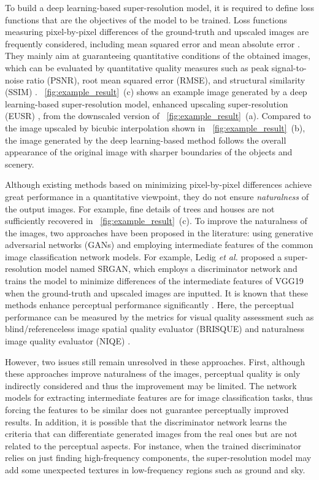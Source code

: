\documentclass[runningheads]{llncs}
\begin{document}
To build a deep learning-based super-resolution model, it is required to define loss functions that are the objectives of the model to be trained.
Loss functions measuring pixel-by-pixel differences of the ground-truth and upscaled images are frequently considered, including mean squared error and mean absolute error \cite{yang2018deep}.
They mainly aim at guaranteeing quantitative conditions of the obtained images, which can be evaluated by quantitative quality measures such as peak signal-to-noise ratio (PSNR), root mean squared error (RMSE), and structural similarity (SSIM) \cite{wang2004image}.
\figurename~\ref{fig:example_result}~(c) shows an example image generated by a deep learning-based super-resolution model, enhanced upscaling super-resolution (EUSR) \cite{kim2018deep}, from the downscaled version of \figurename~\ref{fig:example_result}~(a).
Compared to the image upscaled by bicubic interpolation shown in \figurename~\ref{fig:example_result}~(b), the image generated by the deep learning-based method follows the overall appearance of the original image with sharper boundaries of the objects and scenery.

Although existing methods based on minimizing pixel-by-pixel differences achieve great performance in a quantitative viewpoint, they do not ensure \textit{naturalness} of the output images.
For example, fine details of trees and houses are not sufficiently recovered in \figurename~\ref{fig:example_result}~(c).
To improve the naturalness of the images, two approaches have been proposed in the literature: using generative adversarial networks (GANs) \cite{goodfellow2014generative} and employing intermediate features of the common image classification network models.
For example, Ledig \textit{et al.} \cite{ledig2017photo} proposed a super-resolution model named SRGAN, which employs a discriminator network and trains the model to minimize differences of the intermediate features of VGG19 \cite{simonyan2014very} when the ground-truth and upscaled images are inputted.
It is known that these methods enhance perceptual performance significantly \cite{blau2017perception}.
Here, the perceptual performance can be measured by the metrics for visual quality assessment such as blind/referenceless image spatial quality evaluator (BRISQUE) \cite{mittal2012no} and naturalness image quality evaluator (NIQE) \cite{mittal2013making}.

However, two issues still remain unresolved in these approaches.
First, although these approaches improve naturalness of the images, perceptual quality is only indirectly considered and thus the improvement may be limited.
The network models for extracting intermediate features are for image classification tasks, thus forcing the features to be similar does not guarantee perceptually improved results.
In addition, it is possible that the discriminator network learns the criteria that can differentiate generated images from the real ones but are not related to the perceptual aspects.
For instance, when the trained discriminator relies on just finding high-frequency components, the super-resolution model may add some unexpected textures in low-frequency regions such as ground and sky.
\end{document}
